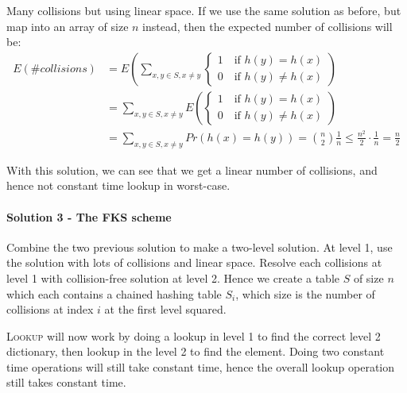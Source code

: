                 Many collisions but using linear space.
                If we use the same solution as before, but map into an array of size $n$ instead, then the expected number of collisions will be:
                \begin{align*}
                    E(\#collisions)
                    &= E\left( \sum_{x,y \in S, x \not = y}
                        \begin{cases}
                            1 \quad \text{if } h(y) = h(x) \\
                            0 \quad \text{if } h(y) \not = h(x)
                        \end{cases}
                        \right) \\
                    &= \sum_{x,y \in S, x \not = y} E \left(
                        \begin{cases}
                            1 \quad \text{if } h(y) = h(x) \\
                            0 \quad \text{if } h(y) \not = h(x)
                        \end{cases}
                        \right) \\
                    &= \sum_{x,y \in S, x \not = y} Pr(h(x) = h(y)) = \binom{n}{2} \frac{1}{n} \leq \frac{n^2}{2} \cdot \frac{1}{n} = \frac{n}{2}
                \end{align*}

                With this solution, we can see that we get a linear number of collisions, and hence not constant time lookup in worst-case.

            \paragraph{Solution 3 - The FKS scheme}

                Combine the two previous solution to make a two-level solution.
                At level 1, use the solution with lots of collisions and linear space.
                Resolve each collisions at level 1 with collision-free solution at level 2.
                Hence we create a table $S$ of size $n$ which each contains a chained hashing table $S_i$, which size is the number of collisions at index $i$ at the first level squared.

                \textsc{Lookup} will now work by doing a lookup in level 1 to find the correct level 2 dictionary, then lookup in the level 2 to find the element.
                Doing two constant time operations will still take constant time, hence the overall lookup operation still takes constant time.

